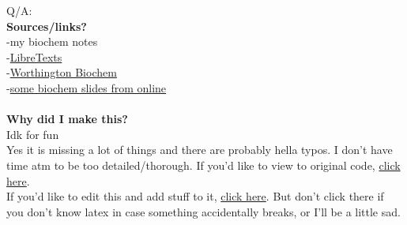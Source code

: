 \documentclass{article}
\begin{document}
\vspace{30mm}
Q/A:\\
\textbf{Sources/links?}\\
-my biochem notes\\
-\href{https://chem.libretexts.org/Textbook_Maps/Biological_Chemistry/Catalysts/Enzymatic_Kinetics/Michaelis-Menten_Kinetics}{LibreTexts}\\
-\href{http://www.worthington-biochem.com/introbiochem/enzymeconc.html}{Worthington Biochem}\\
-\href{https://pdfs.semanticscholar.org/presentation/dfae/6c13fda4a64a495943281d2e8efd8a2d366f.pdf}{some biochem slides from online}\\
\\
\textbf{Why did I make this?}\\
Idk for fun\\
Yes it is missing a lot of things and there are probably hella typos. I don't have time atm to be too detailed/thorough. If you'd like to view to original code, \href{https://www.overleaf.com/read/cktkpzkjxjhg}{click here}.\\
If you'd like to edit this and add stuff to it, \href{https://www.overleaf.com/4136663587tcyzzgjmrtpv}{click here}. But don't click there if you don't know latex in case something accidentally breaks, or I'll be a little sad.
\end{document}

